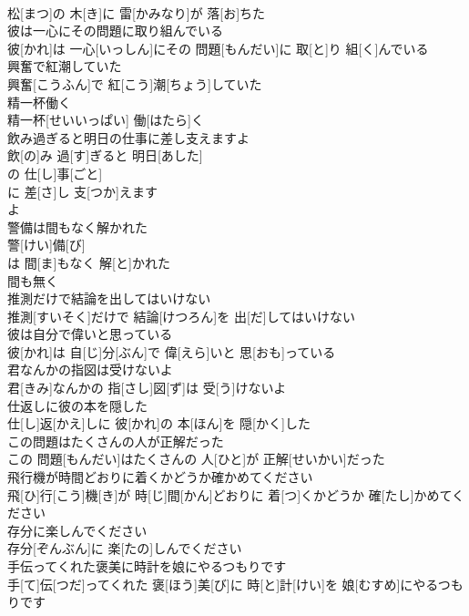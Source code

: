 \documentclass[8pt]{extreport}
\begin{document}
\begin{CJK}{UTF8}{min}
\\	松[まつ]の 木[き]に 雷[かみなり]が 落[お]ちた
\\	彼は一心にその問題に取り組んでいる	
\\	彼[かれ]は 一心[いっしん]にその 問題[もんだい]に 取[と]り 組[く]んでいる
\\	興奮で紅潮していた	
\\	興奮[こうふん]で 紅[こう]潮[ちょう]していた
\\	精一杯働く	
\\	精一杯[せいいっぱい] 働[はたら]く
\\	飲み過ぎると明日の仕事に差し支えますよ	
\\	飲[の]み 過[す]ぎると 明日[あした]
\\	の 仕[し]事[ごと]
\\	に 差[さ]し 支[つか]えます 
\\	よ
\\	警備は間もなく解かれた	
\\	警[けい]備[び]
\\	は 間[ま]もなく 解[と]かれた 
\\	間も無く 
\\	推測だけで結論を出してはいけない	
\\	推測[すいそく]だけで 結論[けつろん]を 出[だ]してはいけない
\\	彼は自分で偉いと思っている	
\\	彼[かれ]は 自[じ]分[ぶん]で 偉[えら]いと 思[おも]っている
\\	君なんかの指図は受けないよ	
\\	君[きみ]なんかの 指[さし]図[ず]は 受[う]けないよ
\\	仕返しに彼の本を隠した	
\\	仕[し]返[かえ]しに 彼[かれ]の 本[ほん]を 隠[かく]した
\\	この問題はたくさんの人が正解だった	
\\	この 問題[もんだい]はたくさんの 人[ひと]が 正解[せいかい]だった
\\	飛行機が時間どおりに着くかどうか確かめてください	
\\	飛[ひ]行[こう]機[き]が 時[じ]間[かん]どおりに 着[つ]くかどうか 確[たし]かめてください
\\	存分に楽しんでください	
\\	存分[ぞんぶん]に 楽[たの]しんでください
\\	手伝ってくれた褒美に時計を娘にやるつもりです	
\\	手[て]伝[つだ]ってくれた 褒[ほう]美[び]に 時[と]計[けい]を 娘[むすめ]にやるつもりです

\end{CJK}
\end{document}
